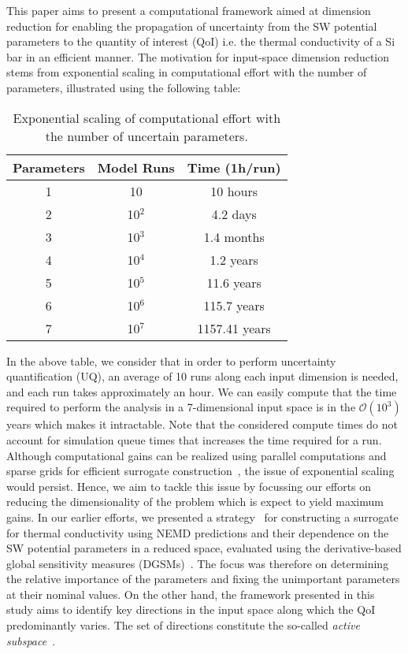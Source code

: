 This paper aims to present a computational framework aimed at dimension reduction
for enabling the propagation of uncertainty from the SW potential parameters to the
quantity of interest (QoI) i.e. the thermal conductivity of a Si bar in an efficient manner. The
motivation for input-space dimension reduction stems from exponential scaling in
computational effort with the number of parameters, illustrated using the following
table:
%
\newcommand{\ra}[1]{\renewcommand{\arraystretch}{#1}}
\begin{table}[htbp]
\centering
\ra{1.3}
\begin{tabular}{@{}ccc@{}}\toprule
Parameters & Model Runs & Time (1h/run)\\
\bottomrule
1 & 10 & 10 hours \\
2 & 10$^2$ & 4.2 days \\
3 & 10$^3$ & 1.4 months \\
4 & 10$^4$ & 1.2 years \\
5 & 10$^5$ & 11.6 years \\
6 & 10$^6$ & 115.7 years \\
7 & 10$^7$ & 1157.41 years \\
\bottomrule
\end{tabular}
\caption{Exponential scaling of computational effort with the number of uncertain parameters.}
\end{table}
%
In the above table, we consider that in order to perform uncertainty quantification (UQ),
an average of 10 runs along each input dimension
is needed, and each run takes approximately an hour. We can easily compute that the time required to 
perform the analysis in a 7-dimensional input space is in the $\mathcal{O}(10^3)$ years which makes it
intractable. Note that the considered compute times do not account for simulation queue times that 
increases the time required for a run. 
Although computational gains can be realized using parallel computations and sparse grids
for efficient surrogate construction~\cite{Ma:2009,Constantine:2012,Petvipusit:2014,Vohra:2014}, 
the issue of exponential scaling would persist.  
Hence, we aim to tackle this issue by focussing our efforts on reducing the dimensionality of the problem
which is expect to yield maximum gains. In our earlier efforts, we presented a strategy~\cite{Vohra:2018b}
for constructing a surrogate for thermal conductivity using NEMD predictions and their dependence
on the SW potential parameters in a reduced space, evaluated using the derivative-based global sensitivity measures
(DGSMs)~\cite{Vohra:2018a}. The focus was therefore on determining the relative importance of the
parameters and fixing the unimportant parameters at their nominal values. On the other hand, the
framework presented in this study aims to identify key directions in the input space along which the
QoI predominantly varies. The set of directions constitute the so-called 
\textit{active subspace}~\cite{Constantine:2015}.  


